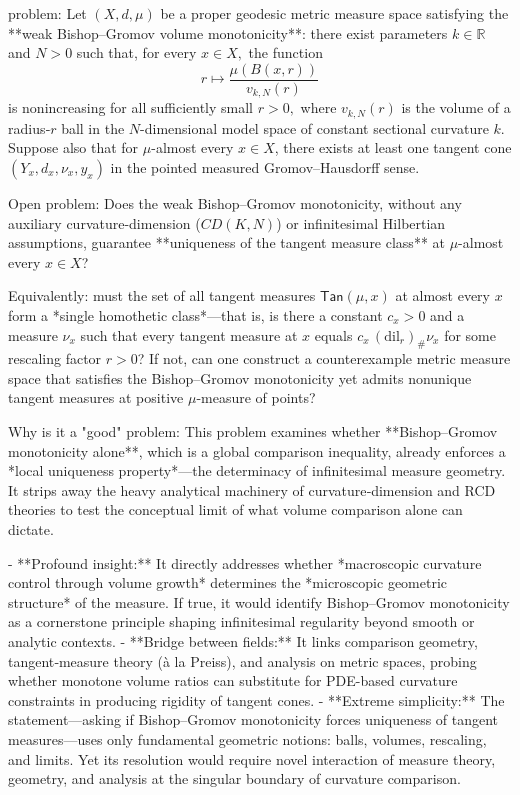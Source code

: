 problem:  
Let \((X,d,\mu)\) be a proper geodesic metric measure space satisfying the **weak Bishop–Gromov volume monotonicity**: there exist parameters \(k\in \mathbb{R}\) and \(N>0\) such that, for every \(x\in X,\) the function  
\[
r\mapsto \frac{\mu(B(x,r))}{v_{k,N}(r)}
\]
is nonincreasing for all sufficiently small \(r>0,\) where \(v_{k,N}(r)\) is the volume of a radius‑\(r\) ball in the \(N\)-dimensional model space of constant sectional curvature \(k\). Suppose also that for \(\mu\)-almost every \(x\in X\), there exists at least one tangent cone \((Y_x, d_x, \nu_x, y_x)\) in the pointed measured Gromov–Hausdorff sense.

Open problem:  
Does the weak Bishop–Gromov monotonicity, without any auxiliary curvature-dimension (\(CD(K,N)\)) or infinitesimal Hilbertian assumptions, guarantee **uniqueness of the tangent measure class** at \(\mu\)-almost every \(x\in X\)?  

Equivalently: must the set of all tangent measures \(\mathsf{Tan}(\mu,x)\) at almost every \(x\) form a *single homothetic class*—that is, is there a constant \(c_x>0\) and a measure \(\nu_x\) such that every tangent measure at \(x\) equals \(c_x\,(\mathrm{dil}_r)_\#\nu_x\) for some rescaling factor \(r>0\)?  
If not, can one construct a counterexample metric measure space that satisfies the Bishop–Gromov monotonicity yet admits nonunique tangent measures at positive \(\mu\)-measure of points?

Why is it a "good" problem:  
This problem examines whether **Bishop–Gromov monotonicity alone**, which is a global comparison inequality, already enforces a *local uniqueness property*—the determinacy of infinitesimal measure geometry. It strips away the heavy analytical machinery of curvature‑dimension and RCD theories to test the conceptual limit of what volume comparison alone can dictate.

- **Profound insight:** It directly addresses whether *macroscopic curvature control through volume growth* determines the *microscopic geometric structure* of the measure. If true, it would identify Bishop–Gromov monotonicity as a cornerstone principle shaping infinitesimal regularity beyond smooth or analytic contexts.  
- **Bridge between fields:** It links comparison geometry, tangent‑measure theory (à la Preiss), and analysis on metric spaces, probing whether monotone volume ratios can substitute for PDE-based curvature constraints in producing rigidity of tangent cones.  
- **Extreme simplicity:** The statement—asking if Bishop–Gromov monotonicity forces uniqueness of tangent measures—uses only fundamental geometric notions: balls, volumes, rescaling, and limits. Yet its resolution would require novel interaction of measure theory, geometry, and analysis at the singular boundary of curvature comparison.